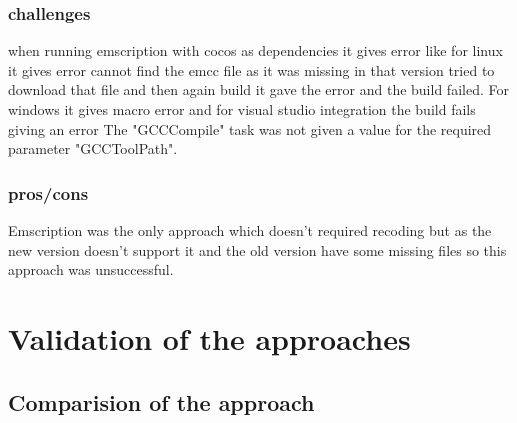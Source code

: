 \documentclass[23pt]{article}
\begin{document}
\subsubsection{challenges}

{\Large when running emscription with cocos as dependencies it gives error like for linux it gives error cannot find the emcc file as it was missing in that version tried to download that file and then again build it gave the error and the build failed. For windows it gives macro error and for visual studio integration the build fails giving an error The "GCCCompile" task was not given a value for the required parameter "GCCToolPath". \par}


\subsubsection{pros/cons}

{\Large Emscription was the only approach which doesn’t required recoding but as the new version doesn’t support it and the old version have some missing files so this approach was unsuccessful. \par}


\section{Validation of the approaches}

\subsection{Comparision of the approach }
\end{document}
